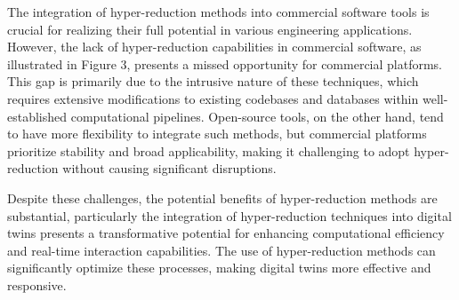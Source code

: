 \documentclass[11pt]{article}
\begin{document}
            The integration of hyper-reduction methods into commercial software tools is crucial for realizing their full potential in various engineering applications.
            However, the lack of hyper-reduction capabilities in commercial software, as illustrated in Figure 3, presents a missed opportunity for commercial platforms.
            This gap is primarily due to the intrusive nature of these techniques, which requires extensive modifications to existing codebases and databases within well-established computational pipelines.
            Open-source tools, on the other hand, tend to have more flexibility to integrate such methods, but commercial platforms prioritize stability and broad applicability, making it challenging to adopt hyper-reduction without causing significant disruptions.

            Despite these challenges, the potential benefits of hyper-reduction methods are substantial, particularly the integration of hyper-reduction techniques into digital twins presents a transformative potential for enhancing computational efficiency and real-time interaction capabilities.
            The use of hyper-reduction methods can significantly optimize these processes, making digital twins more effective and responsive.
\end{document}
